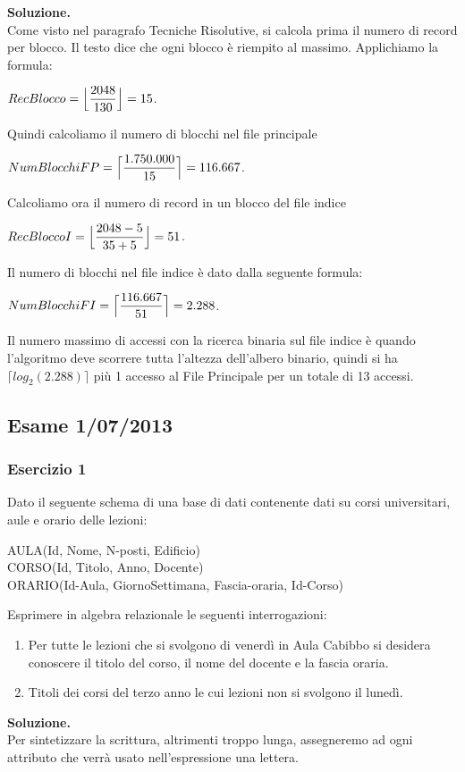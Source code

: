 \noindent\textbf{\fontsize{14pt}{1em}Soluzione.}\\
Come visto nel paragrafo Tecniche Risolutive, si calcola prima il numero di record per blocco. Il testo dice che 
ogni blocco è riempito al massimo. Applichiamo la formula:
\begin{center}
 $RecBlocco = \Bigl\lfloor \dfrac{2048}{130} \Bigr\rfloor = 15$.\\
\end{center}
Quindi calcoliamo il numero di blocchi nel file principale
\begin{center}
 $NumBlocchiFP = \Bigl\lceil \dfrac{1.750.000}{15} \Bigr\rceil = 116.667$.\\
\end{center}
Calcoliamo ora il numero di record in un blocco del file indice
\begin{center}
 $RecBloccoI = \Bigl\lfloor \dfrac{2048-5}{35+5} \Bigr\rfloor = 51$.\\
\end{center}
Il numero di blocchi nel file indice è dato dalla seguente formula:
\begin{center}
  $NumBlocchiFI= \Bigl\lceil \dfrac{116.667}{51} \Bigr\rceil = 2.288$.\\
\end{center}
Il numero massimo di accessi con la ricerca binaria sul file indice è quando l'algoritmo deve scorrere tutta l'altezza
dell'albero binario, quindi si ha $\lceil log_2(2.288)\rceil$ più 1 accesso al File Principale per un totale di 13 accessi.

\newpage
\subsection{Esame 1/07/2013}
  \subsubsection{Esercizio 1}
  Dato il seguente schema di una base di dati contenente dati su corsi universitari, aule e orario delle lezioni:
  \begin{center}
  AULA(Id, Nome, N-posti, Edificio)\\
  CORSO(Id, Titolo, Anno, Docente)\\ 
  ORARIO(Id-Aula, GiornoSettimana, Fascia-oraria, Id-Corso)\\
  \end{center}

  Esprimere in algebra relazionale le seguenti interrogazioni:
  \begin{enumerate}
   \item Per tutte le lezioni che si svolgono di venerdì in Aula Cabibbo si desidera conoscere il titolo del corso,
   il nome del docente e la fascia oraria.
   \item Titoli dei  corsi del terzo anno le cui lezioni non si svolgono il lunedì. 
  \end{enumerate}
  \noindent\textbf{\fontsize{14pt}{1em}Soluzione.}\\
  Per sintetizzare la scrittura, altrimenti troppo lunga, assegneremo ad ogni attributo che verrà usato
  nell'espressione una lettera.
  
